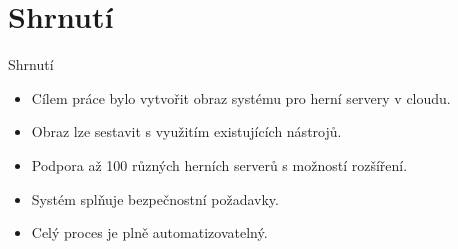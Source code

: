 \documentclass[czech,aspectratio=169]{beamer}
\begin{document}
  \section{Shrnutí}
  \begin{frame}{Shrnutí}
    \begin{itemize}
      \item Cílem práce bylo vytvořit obraz systému pro herní servery v cloudu. 
      \item Obraz lze sestavit s využitím existujících nástrojů.
      \item Podpora až 100 různých herních serverů s možností rozšíření.
      \item Systém splňuje bezpečnostní požadavky.
      \item Celý proces je plně automatizovatelný.
    \end{itemize}
  \end{frame}
\end{document}
